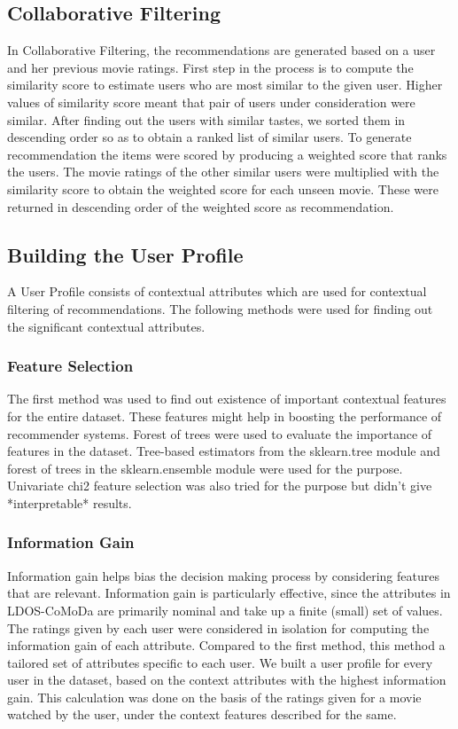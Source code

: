 \documentclass{article}
\begin{document}
\subsection{Collaborative Filtering}
In Collaborative Filtering, the recommendations are generated based on a user and her previous movie ratings. First step in the process is to compute the similarity score to estimate users who are most similar to the given user. Higher values of similarity score meant that pair of users under consideration were similar. After finding out the users with similar tastes, we sorted them in descending order so as to obtain a ranked list of similar users. To generate recommendation the items were scored by producing a weighted score that
ranks the users. The movie ratings of the other similar users were multiplied with the similarity score to obtain the weighted score for each unseen movie. These were returned in descending order of the weighted score as recommendation. \cite{segaran2008programming}  

\subsection{Building the User Profile}

A User Profile consists of contextual attributes which are used for contextual filtering of recommendations. The following methods were used for finding out the significant contextual attributes.

\subsubsection{Feature Selection}

The first method was used to find out existence of important contextual features for the entire dataset. These features might help in boosting the performance of recommender systems. Forest of trees were used to evaluate the importance of features in the dataset. Tree-based estimators from the sklearn.tree module and forest of trees in the sklearn.ensemble module were used for the purpose. Univariate chi2 feature selection was also tried for the purpose but didn't give *interpretable* results. 

\subsubsection{Information Gain}

Information gain helps bias the decision making process by considering features that are relevant. Information gain is particularly effective, since the attributes in LDOS-CoMoDa are primarily nominal and take up a finite (small) set of values. The ratings given by each user were considered in isolation for computing the information gain of each attribute. Compared to the first method, this method a tailored set of attributes specific to each user. We built a user profile for every user in the dataset, based on the context attributes with the highest information gain. This calculation was done on the basis of the ratings given for a movie watched by the user, under the context features described for the same.
\end{document}
